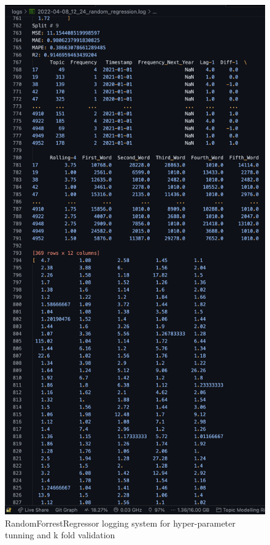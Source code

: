 \documentclass[12pt,MSc,a4paper,oneside]{muthesis}
\begin{document}
    \label{appendix:13}
    \begin{figure}[h]
      \centering
      \includegraphics[scale=0.5]{results/regression_log.png}
      \caption{RandomForrestRegressor logging system for hyper-parameter tunning and k fold validation}
    \end{figure}


    
\end{document}
